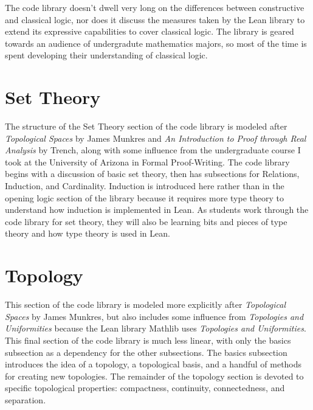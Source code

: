 The code library doesn't dwell very long on the differences between 
constructive and classical logic, nor does it discuss the measures
taken by the Lean library to extend its expressive capabilities to 
cover classical logic. The library is geared towards an audience of 
undergradute mathematics majors, so most of the time is spent developing
their understanding of classical logic.


\section{Set Theory}

The structure of the Set Theory section of the code library is modeled after 
\textit{Topological Spaces} by James Munkres and 
\textit{An Introduction to Proof through Real Analysis} by Trench, along with
some influence from the undergraduate course I took at the University of Arizona
in Formal Proof-Writing. The code library begins with a discussion of basic
set theory, then has subsections for Relations, Induction, and Cardinality. 
Induction is introduced here rather than in the opening logic section of the 
library because it requires more type theory to understand how induction is
implemented in Lean. As students work through the code library for set theory,
they will also be learning bits and pieces of type theory and how type theory
is used in Lean. 

\section{Topology}

This section of the code library is modeled more explicitly after 
\textit{Topological Spaces} by James Munkres, but also includes
some influence from \textit{Topologies and Uniformities} because 
the Lean library Mathlib uses \textit{Topologies and Uniformities}.
This final section of the code library is much less linear, with only the
basics subsection as a dependency for the other subsections. The basics
subsection introduces the idea of a topology, a topological basis, and 
a handful of methods for creating new topologies. The remainder of the 
topology section is devoted to specific topological properties:
compactness, continuity, connectedness, and separation.